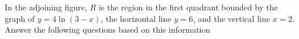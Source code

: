 
%
%
%
%
% 
% 

\question In the adjoining figure, $R$ is the region in the first quadrant bounded by the graph of  
$y =4\ln (3-x)$, the horizontal line $y=6$, and the vertical line $x=2$. Answer the following questions 
based on this information 


